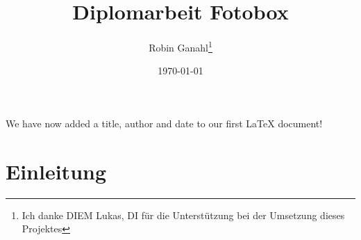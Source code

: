 \documentclass[12pt, a4paper]{article}
\title{Diplomarbeit Fotobox}
\author{Robin Ganahl\thanks{Ich danke DIEM Lukas, DI für die Unterstützung bei der Umsetzung dieses Projektes}}
\date{\today}
\begin{document}
\maketitle
We have now added a title, author and date to our first \LaTeX{} document!

\newpage
\tableofcontents
\newpage
\section{Einleitung}




\end{document}
